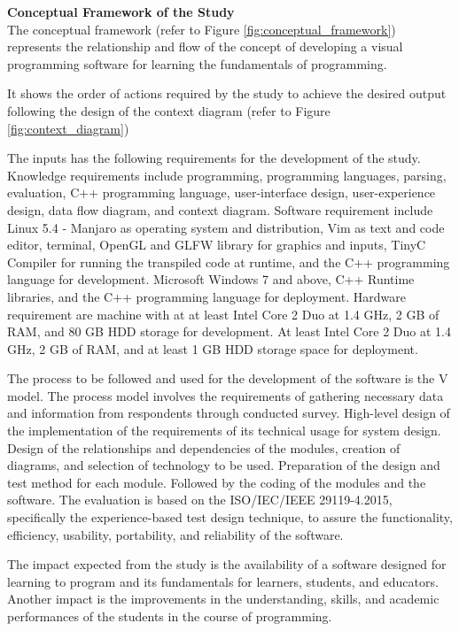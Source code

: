 \flushleft
\textbf{Conceptual Framework of the Study}\\

\justifying
\parx
The conceptual framework (refer to Figure \ref{fig:conceptual_framework}) represents the relationship
and flow of the concept of developing a visual programming software for learning the
fundamentals of programming.

\parx
It shows the order of actions required by the study to achieve the desired
output following the design of the context diagram (refer to Figure \ref{fig:context_diagram})

\parx
The inputs has the following requirements for the development of the study.
Knowledge requirements include programming, programming languages, parsing,
evaluation, C++ programming language, user-interface design, user-experience
design, data flow diagram, and context diagram.  Software requirement include
Linux 5.4 - Manjaro as operating system and distribution, Vim as text and code
editor, terminal, OpenGL and GLFW library for graphics and inputs, TinyC
Compiler for running the transpiled code at runtime, and the C++ programming
language for development. Microsoft Windows 7 and above, C++ Runtime libraries,
and the C++ programming language for deployment.  Hardware requirement are
machine with at at least Intel Core 2 Duo at 1.4 GHz, 2 GB of RAM, and 80 GB
HDD storage for development. At least Intel Core 2 Duo at 1.4 GHz, 2 GB of RAM,
and at least 1 GB HDD storage space for deployment.

\parx
The process to be followed and used for the development of the software is the V model.
The process model involves the requirements of gathering necessary data and information
from respondents through conducted survey. High-level design of the implementation of
the requirements of its technical usage for system design. Design of the relationships
and dependencies of the modules, creation of diagrams, and selection of technology to
be used. Preparation of the design and test method for each module. Followed by the
coding of the modules and the software. The evaluation is based on the ISO/IEC/IEEE
29119-4.2015, specifically the experience-based test design technique, to assure the
functionality, efficiency, usability, portability, and reliability of the software.

\parx
The impact expected from the study is the availability of a software designed for
learning to program and its fundamentals for learners, students, and educators.
Another impact is the improvements in the understanding, skills, and academic
performances of the students in the course of programming.


